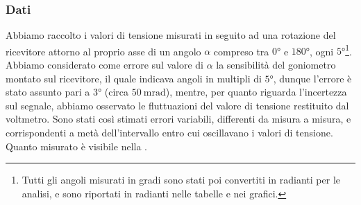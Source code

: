 \documentclass[a4paper]{article}
\begin{document}
\subsubsection{Dati}
Abbiamo raccolto i valori di tensione misurati in seguito ad una rotazione del ricevitore attorno al proprio asse di un angolo $\alpha$ compreso tra $\ang{0}$ e $\ang{180}$, 
ogni $\ang{5}$\footnote{Tutti gli angoli misurati in gradi sono stati poi convertiti in radianti per le analisi, e sono riportati in radianti nelle tabelle e nei grafici.}.
Abbiamo considerato come errore sul valore di $\alpha$ la sensibilità del goniometro montato sul ricevitore, il quale indicava angoli in multipli di $\ang{5}$,
dunque l'errore è stato assunto pari a $\ang{3}$ (circa $\SI{50}{\milli\radian}$), mentre, per quanto riguarda l'incertezza sul segnale, abbiamo osservato le fluttuazioni del valore di tensione restituito dal voltmetro.
Sono stati così stimati errori variabili, differenti da misura a misura, e corrispondenti a metà dell'intervallo entro cui oscillavano i valori di tensione.
Quanto misurato è visibile nella .
\end{document}
